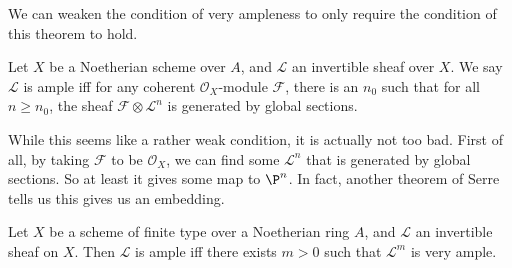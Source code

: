 \documentclass[a4paper]{article}
\begin{document}
We can weaken the condition of very ampleness to only require the condition of this theorem to hold.
\begin{defi}
  Let $X$ be a Noetherian scheme over $A$, and $\mathcal{L}$ an invertible sheaf over $X$. We say $\mathcal{L}$ is ample iff for any coherent $\mathcal{O}_X$-module $\mathcal{F}$, there is an $n_0$ such that for all $n \geq n_0$, the sheaf $\mathcal{F} \otimes \mathcal{L}^n$ is generated by global sections.
\end{defi}

While this seems like a rather weak condition, it is actually not too bad. First of all, by taking $\mathcal{F}$ to be $\mathcal{O}_X$, we can find some $\mathcal{L}^n$ that is generated by global sections. So at least it gives some map to $\P^n$. In fact, another theorem of Serre tells us this gives us an embedding.

\begin{thm}[Serre]
  Let $X$ be a scheme of finite type over a Noetherian ring $A$, and $\mathcal{L}$ an invertible sheaf on $X$. Then $\mathcal{L}$ is ample iff there exists $m > 0$ such that $\mathcal{L}^m$ is very ample.
\end{thm}
\end{document}
